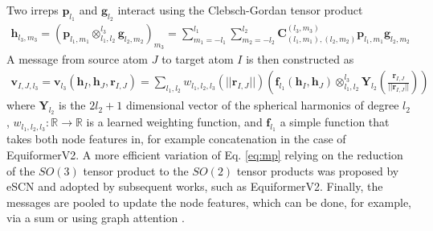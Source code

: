 \documentclass[pdflatex,sn-mathphys-num]{sn-jnl}%
\theoremstyle{thmstyleone}%
\theoremstyle{thmstyletwo}%
\theoremstyle{thmstylethree}%
\begin{document}
Two irreps $\mathbf{p}_{l_1}$ and $\mathbf{g}_{l_2}$ interact using the Clebsch-Gordan tensor product \citep{thomas2018}
\begin{align}
    \mathbf{h}_{l_3,m_3} = \left( \mathbf{p}_{l_1,m_1} \otimes_{l_1, l_2}^{l_3} \mathbf{g}_{l_2,m_2} \right)_{m_3} = \sum_{m_1 = -l_1}^{l_1} \sum_{m_2 = -l_2}^{l_2} \mathbf{C}_{(l_1,m_1),(l_2,m_2)}^{(l_3,m_3)} \mathbf{p}_{l_1,m_1} \mathbf{g}_{l_2,m_2} \label{eq:tp}
\end{align}
A message from source atom $J$ to target atom $I$ is then constructed as
\begin{align}
    \mathbf{v}_{I,J, l_3} = \mathbf{v}_{l_3}(\mathbf{h}_I, \mathbf{h}_J, \mathbf{r}_{I,J}) = \sum_{l_1, l_2} w_{l_1, l_2, l_3}(||\mathbf{r}_{I,J}||) \left( \mathbf{f}_{l_1}(\mathbf{h}_{I},\mathbf{h}_{J}) \otimes_{l_1, l_2}^{l_3} \mathbf{Y}_{l_2}\left(\frac{\mathbf{r}_{I,J}}{||\mathbf{r}_{I,J}||}\right) \right) \label{eq:mp}
\end{align}
where $\mathbf{Y}_{l_2}$ is the $2l_2+1$ dimensional vector of the spherical harmonics of degree $l_2$, $w_{l_1, l_2, l_3}: \mathbb{R} \rightarrow \mathbb{R}$ is a learned weighting function, and $\mathbf{f}_{l_1}$ a simple function that takes both node features in, for example concatenation in the case of EquiformerV2.
A more efficient variation of Eq. \eqref{eq:mp} relying on the reduction of the $SO(3)$ tensor product to the $SO(2)$ tensor products was proposed by eSCN \citep{eSCN2023} and adopted by subsequent works, such as EquiformerV2.
Finally, the messages are pooled to update the node features, which can be done, for example, via a sum or using graph attention \citep{liao2023equiformerv2}.

\end{document}
